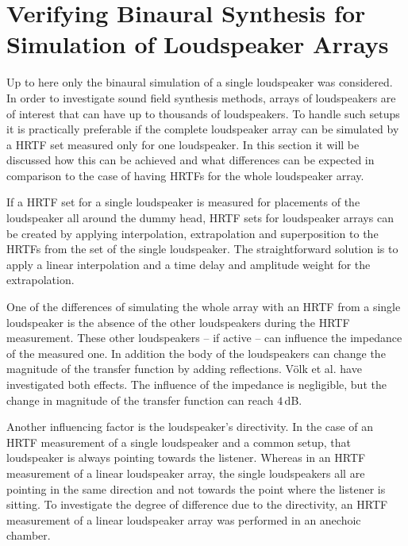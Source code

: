 \section[Simulation of Loudspeaker Arrays]{Verifying Binaural Synthesis for Simulation of Loudspeaker
Arrays\autocite[Parts of this section are published in][]{Wierstorf2012}}
\label{sec:verifying_binaural_synthesis_for_simulation_of_loudspeaker_arrays}
%
Up to here only the binaural simulation of a single loudspeaker was considered.
In order to investigate sound field synthesis methods, arrays of
loudspeakers are of interest that can have up to thousands of loudspeakers. To
handle such setups it is practically preferable if the complete loudspeaker
array can be
simulated by a \ac{HRTF} set measured only for one loudspeaker. In this section it
will be discussed how this can be achieved and what differences can be expected
in comparison to the case of having \acp{HRTF} for the whole loudspeaker array.

If a \ac{HRTF} set for a single loudspeaker is measured for placements of the
loudspeaker all around the dummy head, \ac{HRTF} sets for loudspeaker arrays can be
created by applying interpolation, extrapolation and superposition
to the \acp{HRTF} from the set of
the single loudspeaker. The straightforward solution is to apply a linear interpolation
and a time delay and amplitude weight for the extrapolation.

One of the differences of simulating the whole array with an \ac{HRTF} from a single
loudspeaker is the absence of the other loudspeakers during the \ac{HRTF} measurement.
These other loudspeakers -- if active -- can influence the impedance
of the measured one. In addition the body of the loudspeakers can change 
the magnitude of the transfer function by adding reflections.
Völk et al.\autocite{Volk2010c} have investigated both effects. The influence of
the impedance is negligible, but the change in magnitude of the transfer
function can reach $4$\,dB.

Another influencing factor is the loudspeaker's directivity.
In the case of an \ac{HRTF} measurement of a single loudspeaker and
a common setup, that
loudspeaker is always pointing towards the listener. Whereas in an \ac{HRTF}
measurement of a linear loudspeaker array, the single loudspeakers all are pointing in
the same direction and not towards the point where the listener is sitting. To
investigate the degree of difference due to the directivity, an \ac{HRTF} measurement
of a linear loudspeaker array was performed in an anechoic chamber.

